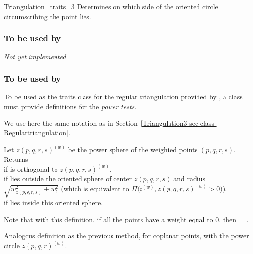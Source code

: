 \begin{ccRefConcept}{Triangulation_traits_3}
{Determines on which side of the oriented circle circumscribing
 the point  lies. 
}  

\subsubsection{To be used by \protect 
{}}

\textit{Not yet implemented}

\subsubsection{To be used by \protect 
{}}

\ccDefinition

To be used as the traits class for the regular triangulation provided
by \cgal, a class must provide definitions for the \textit{power tests}.

We use here the same notation as in
Section~\ref{Triangulation3-sec-class-Regulartriangulation}. 

{Let ${z(p,q,r,s)}^{(w)}$ be the power sphere of the weighted points 
$(p,q,r,s)$. Returns \\
 if  is orthogonal to
${z(p,q,r,s)}^{(w)}$,\\ 
 if  lies outside the oriented sphere of
center $z(p,q,r,s)$ and radius $\sqrt{ w_{z(p,q,r,s)}^2 + w_t^2 }$
(which is equivalent to $\Pi({t}^{(w)},{z(p,q,r,s)}^{(w)} >0$)),\\
 if  lies inside this oriented sphere.
}

Note that with this definition, if all the points have a weight equal
to 0, then
 = .

{Analogous definition as the previous method, for coplanar points,
with the power circle ${z(p,q,r)}^{(w)}$.
}


\end{ccRefConcept}

